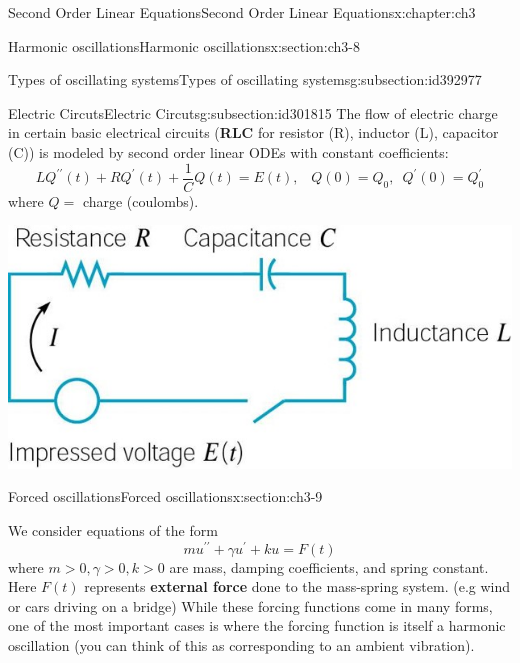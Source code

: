 \documentclass[oneside,10pt,]{book}
\newcommand{\terminology}[1]{\textbf{#1}}
\numberwithin{equation}{section}
\numberwithin{equation}{section}
\begin{document}
\begin{chapterptx}{Second Order Linear Equations}{}{Second Order Linear Equations}{}{}{x:chapter:ch3}
\begin{sectionptx}{Harmonic oscillations}{}{Harmonic oscillations}{}{}{x:section:ch3-8}
\begin{subsectionptx}{Types of oscillating systems}{}{Types of oscillating systems}{}{}{g:subsection:id392977}
\begin{image}{0}{1}{0}
\end{image}%
\end{subsectionptx}
%
%
\typeout{************************************************}
\typeout{************************************************}
%
\begin{subsectionptx}{Electric Circuts}{}{Electric Circuts}{}{}{g:subsection:id301815}
The flow of electric charge in certain basic electrical circuits (\terminology{RLC} for resistor (R), inductor (L), capacitor (C)) is modeled by second order linear ODEs with constant coefficients:%
\begin{equation*}
LQ^{\prime\prime}(t)+RQ^{\prime}(t)+\frac{1}{C}Q(t)=E(t),\,\,\,\,\,Q(0)=Q_{0},\,\,\,Q^{\prime}(0)=Q_{0}^{\prime}
\end{equation*}
where \(Q=\) charge (coulombs).%
\begin{image}{0}{1}{0}%
\includegraphics[width=\linewidth]{images/Spring7.jpg}
\end{image}%
\end{subsectionptx}
\end{sectionptx}
%
%
\typeout{************************************************}
\typeout{************************************************}
%
\begin{sectionptx}{Forced oscillations}{}{Forced oscillations}{}{}{x:section:ch3-9}
\begin{introduction}{}%
We consider equations of the form%
\begin{equation*}
mu^{\prime\prime}+\gamma u^{\prime}+ku=F(t)
\end{equation*}
where \(m>0,\gamma>0,k>0\) are mass, damping coefficients, and spring constant. Here \(F(t)\) represents \terminology{external force} done to the mass-spring system. (e.g wind or cars driving on a bridge) While these forcing functions come in many forms, one of the most important cases is where the forcing function is itself a harmonic oscillation (you can think of this as corresponding to an ambient vibration).%

\end{introduction}
\end{sectionptx}
\end{chapterptx}
\end{document}
